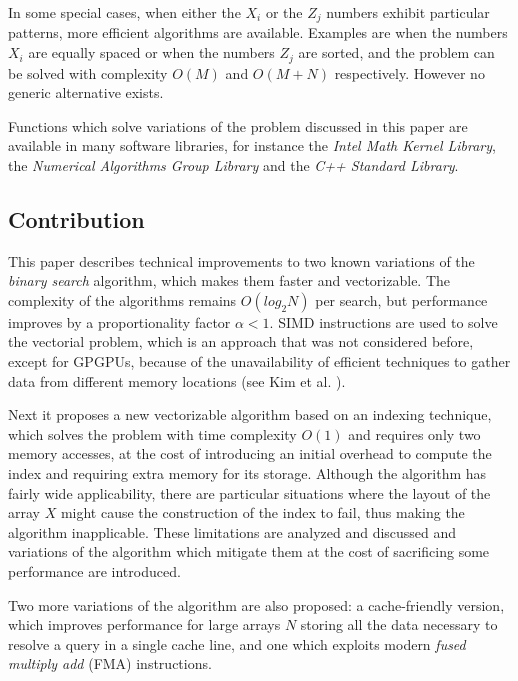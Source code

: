 \documentclass[preprint,1p,times]{elsarticle}
\begin{document}
In some special cases, when either the $X_i$ or the $Z_j$ numbers exhibit particular patterns, more efficient algorithms are available. 
Examples are when the numbers $X_i$ are equally spaced or when the numbers $Z_j$ are sorted, 
and the problem can be solved with complexity $O(M)$ and $O(M+N)$ respectively. However no generic alternative exists.

Functions which solve variations of the problem discussed in this paper are available in many software libraries, for instance the \textit{Intel Math Kernel Library}, the \textit{Numerical Algorithms Group Library} and the \textit{C++ Standard Library}.



\subsection{Contribution}
This paper describes technical improvements to two known variations of the \textit{binary search} algorithm, which makes them faster and vectorizable. The complexity of the algorithms remains $O\left(log_2N\right)$ per search, but performance improves by a proportionality factor $\alpha<1$. SIMD instructions are used to solve the vectorial problem, which is an approach that was not considered before, except for GPGPUs, because of the unavailability of efficient techniques to gather data from different memory locations (see Kim et al. \cite{Kim2011}).

Next it proposes a new vectorizable algorithm based on an indexing technique, which solves the problem with time complexity $O(1)$ and requires only two memory accesses, at the cost of introducing an initial overhead to compute the index and requiring extra memory for its storage. Although the algorithm has fairly wide applicability, there are particular situations where the layout of the array $X$ might cause the construction of the index to fail, thus making the algorithm inapplicable. These limitations are analyzed and discussed and variations of the algorithm which mitigate them at the cost of sacrificing some performance are introduced.

Two more variations of the algorithm are also proposed: a cache-friendly version, which improves performance for large arrays $N$ storing all the data necessary to resolve a query in a single cache line, and one which exploits modern \textit{fused multiply add} (FMA) instructions.
\end{document}
